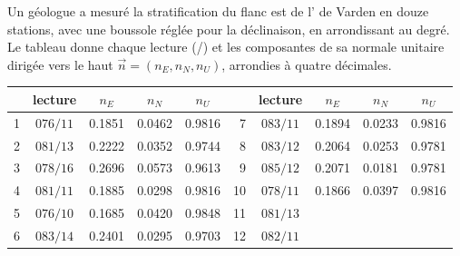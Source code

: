 \begin{problem}
\label{pb:b1:field-lab-methods-1:1}
Un géologue a mesuré la stratification du flanc est de l' de Varden en
douze stations, avec une boussole réglée pour la déclinaison, en arrondissant au
degré. Le tableau donne chaque lecture (/) et les
composantes de sa normale unitaire dirigée vers le haut
$\vec n = (n_E, n_N, n_U)$, arrondies à quatre décimales.
\begin{center}
\small
\begin{tabular}{rcccc@{\qquad}rcccc}
\hline
 & lecture & $n_E$ & $n_N$ & $n_U$ & & lecture & $n_E$ & $n_N$ & $n_U$ \\
\hline
1 & $076/11$ & 0.1851 & 0.0462 & 0.9816 & 7 & $083/11$ & 0.1894 & 0.0233 & 0.9816 \\
2 & $081/13$ & 0.2222 & 0.0352 & 0.9744 & 8 & $083/12$ & 0.2064 & 0.0253 & 0.9781 \\
3 & $078/16$ & 0.2696 & 0.0573 & 0.9613 & 9 & $085/12$ & 0.2071 & 0.0181 & 0.9781 \\
4 & $081/11$ & 0.1885 & 0.0298 & 0.9816 & 10 & $078/11$ & 0.1866 & 0.0397 & 0.9816 \\
5 & $076/10$ & 0.1685 & 0.0420 & 0.9848 & 11 & $081/13$ & & & \\
6 & $083/14$ & 0.2401 & 0.0295 & 0.9703 & 12 & $082/11$ & & & \\
\hline
\end{tabular}
\end{center}


\end{problem}
